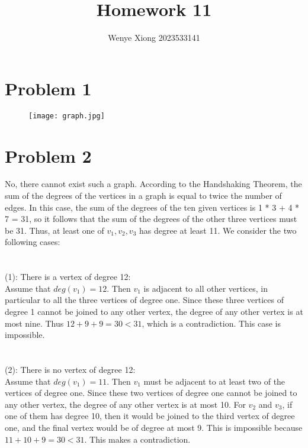 \documentclass{article}
\author{Wenye Xiong 2023533141}
\title{Homework 11}
\begin{document}
\maketitle
\section{Problem 1}
\begin{figure}[H]
\centering
\texttt{[image: graph.jpg]}
\end{figure}
\section{Problem 2}
No, there cannot exist such a graph. According to the Handshaking Theorem, the sum of the degrees of the vertices in a graph is equal to twice the number of edges. In this case, the sum of the degrees of the ten given vertices is 1 * 3 + 4 * 7 = 31, so it follows that the sum of the degrees of the other three vertices must be 31. Thus, at least one of $v_1, v_2, v_3$ has degree at least 11. We consider the two following cases:\\
\\ \hspace*{\fill} \\
(1): There is a vertex of degree 12:\\
Assume that $deg(v_1) = 12$. Then $v_1$ is adjacent to all other vertices, in particular to all the three vertices of degree one. Since these three vertices of degree 1 cannot be joined to any other vertex, the degree of any other vertex is at most nine. Thus $12 + 9 + 9 = 30 < 31$, which is a contradiction. This case is impossible.\\
\\ \hspace*{\fill} \\
(2): There is no vertex of degree 12:\\
Assume that $deg(v_1) = 11$. Then $v_1$ must be adjacent to at least two of the vertices of degree one. Since these two vertices of degree one cannot be joined to any other vertex, the degree of any other vertex is at most 10. For $v_2$ and $v_3$, if one of them has degree 10, then it would be joined to the third vertex of degree one, and the final vertex would be of degree at most 9. This is impossible because $11 + 10 + 9 = 30 < 31$. This makes a contradiction.
\end{document}
